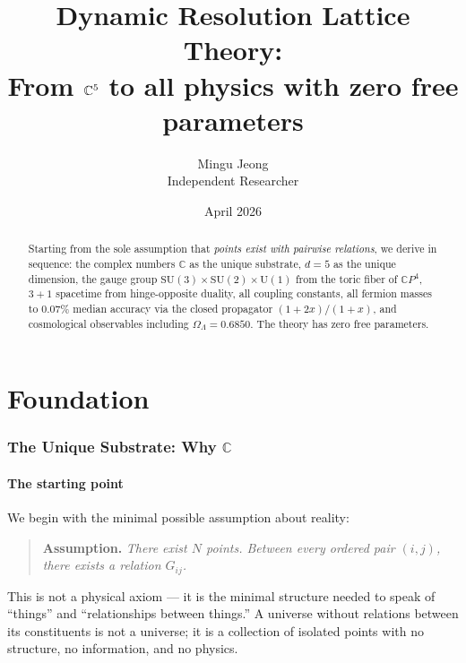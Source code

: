 \documentclass[12pt]{article}
\title{Dynamic Resolution Lattice Theory:\\[6pt]
\large From $\CC^5$ to all physics with zero free parameters}
\author{Mingu Jeong\\Independent Researcher}
\date{April 2026}
\theoremstyle{remark}
\theoremstyle{definition}
\newcommand{\CP}{\mathbb{C}P}
\newcommand{\CC}{\mathbb{C}}
\begin{document}
\maketitle

\begin{abstract}
Starting from the sole assumption that \emph{points exist with pairwise
relations}, we derive in sequence: the complex numbers $\CC$ as the
unique substrate, $d = 5$ as the unique dimension, the gauge group
$\mathrm{SU}(3)\times\mathrm{SU}(2)\times\mathrm{U}(1)$ from the
toric fiber of $\CP^4$, $3+1$ spacetime from hinge-opposite duality,
all coupling constants, all fermion masses to $0.07\%$ median accuracy
via the closed propagator $(1+2x)/(1+x)$, and cosmological observables
including $\Omega_\Lambda = 0.6850$.  The theory has zero free parameters.
\end{abstract}

\tableofcontents
\newpage

\part{Foundation}

\section{The Unique Substrate: Why $\mathbb{C}$}
\label{ch:whyC}

\subsection{The starting point}

We begin with the minimal possible assumption about reality:

\begin{quote}
\textbf{Assumption.} \emph{There exist $N$ points. Between every ordered pair $(i, j)$, there exists a relation $G_{ij}$.}
\end{quote}

This is not a physical axiom --- it is the minimal structure needed to speak of ``things'' and ``relationships between things.'' A universe without relations between its constituents is not a universe; it is a collection of isolated points with no structure, no information, and no physics.
\end{document}
